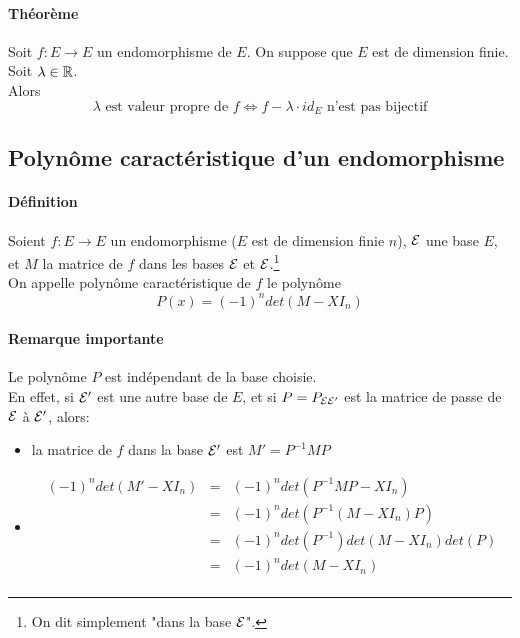 \begin{enumerate}
\end{enumerate}

\paragraph{Théorème} Soit $f: E \rightarrow E$ un endomorphisme de $E$. On suppose que $E$ est de dimension finie. Soit $\lambda \in \mathbb{R}$. \\
Alors 
$$\lambda \text{ est valeur propre de } f \Leftrightarrow f- \lambda \cdot id_E \text{ n'est pas bijectif}$$
      

%
\subsection{Polynôme caractéristique d'un endomorphisme}
%
\paragraph{Définition} Soient $f: E \rightarrow E$ un endomorphisme ($E$ est de dimension finie $n$), $\mathcal{E}$ une base $E$, et $M$ la matrice de $f$ dans les bases $\mathcal{E}$ et $\mathcal{E}$.\footnote{On dit simplement "dans la base $\mathcal{E}$".} \\
On appelle polynôme caractéristique de $f$ le polynôme
$$P(x) = (-1)^{n} det(M - X I_n)$$

\paragraph{Remarque importante} Le polynôme $P$ est indépendant de la base choisie. \\
En effet, si $\mathcal{E}'$ est une autre base de $E$, et si $P = P_{\mathcal{E} \mathcal{E}'}$ est la matrice de passe de $\mathcal{E}$ à $\mathcal{E}'$, alors:
\begin{itemize}
  \item la matrice de $f$ dans la base $\mathcal{E}'$ est $M' = P^{-1} M P$
  \item 
    \begin{eqnarray*}
      (-1)^{n} det(M' - X I_n) &=& (-1)^{n} det(P^{-1} M P - X I_n) \\
        &=& (-1)^{n} det(P^{-1} (M - X I_n) P) \\
        &=& (-1)^{n} det(P^{-1}) det(M - X I_n) det(P) \\
        &=& (-1)^{n} det(M - X I_n) \\
    \end{eqnarray*}
\end{itemize}

